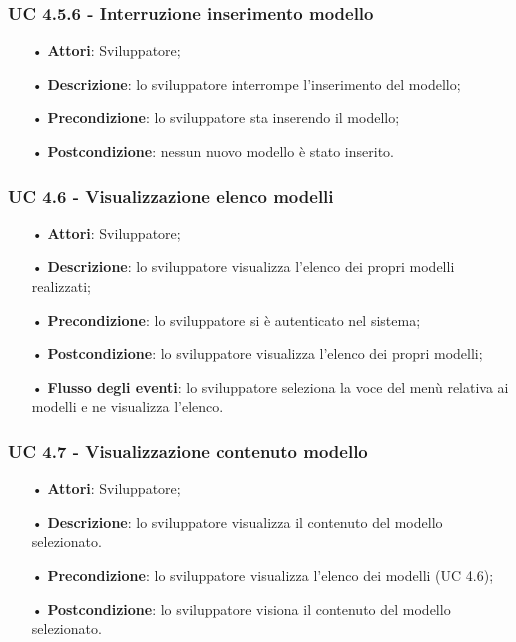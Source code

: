 \subsubsection{UC 4.5.6 - Interruzione inserimento modello}
\begin{itemize}
\item[•]\textbf{Attori}: Sviluppatore;
\item[•]\textbf{Descrizione}: lo sviluppatore interrompe l'inserimento del modello;
\item[•]\textbf{Precondizione}: lo sviluppatore sta inserendo il modello;
\item[•]\textbf{Postcondizione}: nessun nuovo modello è stato inserito.
\end{itemize}

\subsubsection{UC 4.6 - Visualizzazione elenco modelli}
\begin{itemize}
\item[•]\textbf{Attori}: Sviluppatore;
\item[•]\textbf{Descrizione}: lo sviluppatore visualizza l'elenco dei propri modelli realizzati;
\item[•]\textbf{Precondizione}: lo sviluppatore si è autenticato nel sistema;
\item[•]\textbf{Postcondizione}: lo sviluppatore visualizza l'elenco dei propri modelli;
\item[•]\textbf{Flusso degli eventi}:  lo sviluppatore seleziona la voce del menù relativa ai modelli e ne visualizza l'elenco.
\end{itemize}


\subsubsection{UC 4.7 - Visualizzazione contenuto modello} 
\begin{itemize}
\item[•]\textbf{Attori}: Sviluppatore;
\item[•]\textbf{Descrizione}: lo sviluppatore visualizza il contenuto del modello selezionato.
\item[•]\textbf{Precondizione}: lo sviluppatore visualizza l'elenco dei modelli (UC 4.6);
\item[•]\textbf{Postcondizione}: lo sviluppatore visiona il contenuto del modello selezionato.
\end{itemize}

